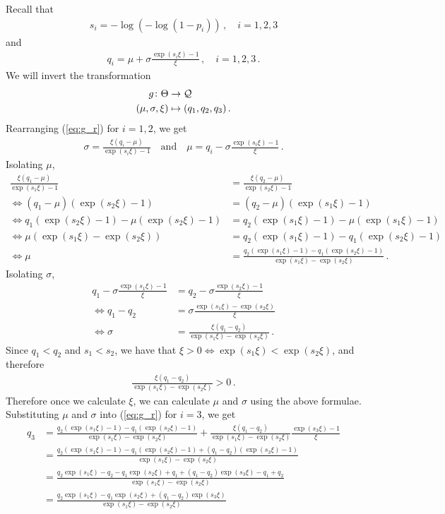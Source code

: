 %
Recall that
%
\begin{align*}
s_i = -\log(-\log(1 - p_i)) \,, \quad i = 1, 2, 3 
\end{align*}
%
and
%
\begin{align}
q_i = \mu + \sigma \frac{\exp(s_i \xi) - 1}{\xi} \,, \quad i = 1, 2, 3 \,.
\label{eq:g_r}
\end{align}
%
We will invert the transformation
%
\begin{align*}
g \colon \Theta &\to {\cal Q}\\
(\mu, \sigma, \xi) &\mapsto (q_{1}, q_{2}, q_{3}) \,.
\end{align*}
%
Rearranging (\ref{eq:g_r}) for $i = 1, 2$, we get
%
\begin{align*}
\sigma = \frac{\xi(q_i - \mu)}{\exp(s_i \xi) - 1} \quad
\text{and} \quad \mu = q_i - \sigma \frac{\exp(s_i \xi) - 1}{\xi} \,.
\end{align*}
%
Isolating $\mu$,
%
\begin{align*}
\frac{\xi(q_1 - \mu)}{\exp(s_1 \xi) - 1}
&= \frac{\xi(q_2 - \mu)}{\exp(s_2 \xi) - 1}\\
\iff (q_1 - \mu)(\exp(s_2 \xi) - 1) &= (q_2 - \mu)(\exp(s_1 \xi) - 1)\\
\iff q_1 (\exp(s_2 \xi) - 1) - \mu(\exp(s_2 \xi) - 1)
&= q_2 (\exp(s_1 \xi) - 1) - \mu (\exp(s_1 \xi) - 1)\\
\iff \mu(\exp(s_1 \xi) - \exp(s_2 \xi))
&= q_2 (\exp(s_1 \xi) - 1) - q_1 (\exp(s_2 \xi) - 1)\\
\iff \mu &= \frac{q_2 (\exp(s_1 \xi) - 1) - q_1 (\exp(s_2 \xi) - 1)}
{\exp(s_1 \xi) - \exp(s_2 \xi)} \,.
\end{align*}
%
Isolating $\sigma$,
%
\begin{align*}
q_1 - \sigma \frac{\exp(s_1 \xi) - 1}{\xi}
&= q_2 - \sigma \frac{\exp(s_2 \xi) - 1}{\xi}\\
\iff q_1 - q_2 &= \sigma \frac{\exp(s_1 \xi) - \exp(s_2 \xi)}{\xi}\\
\iff \sigma &= \frac{\xi (q_1 - q_2)}{\exp(s_1 \xi) - \exp(s_2 \xi)} \,.
\end{align*}
%
Since $q_1 < q_2$ and $s_1 < s_2$,
we have that $\xi > 0 \iff \exp(s_1 \xi)<\exp(s_2 \xi)$, and therefore
%
\begin{align*}
\frac{\xi(q_1 - q_2)}{\exp(s_1 \xi) - \exp(s_2 \xi)} > 0 \,.
\end{align*}
%
Therefore once we calculate $\xi$, we can calculate $\mu$ and $\sigma$
using the above formulae.
Substituting $\mu$ and $\sigma$ into (\ref{eq:g_r}) for $i = 3$, we get
%
\begin{align*}
q_3 &= \frac{q_2 (\exp(s_1 \xi) - 1) - q_1 (\exp(s_2 \xi) - 1)}
{\exp(s_1 \xi) - \exp(s_2 \xi)} + \frac{\xi (q_1 - q_2)}
{\exp(s_1 \xi) - \exp(s_2 \xi)} \frac{\exp(s_3 \xi) - 1}{\xi}\\
&= \frac{q_2 (\exp(s_1 \xi) - 1) - q_1 (\exp(s_2 \xi) - 1)
	+ (q_1 - q_2)(\exp(s_3 \xi) - 1)}{\exp(s_1 \xi) - \exp(s_2 \xi)}\\
&= \frac{q_2 \exp(s_1 \xi) - q_2 - q_1 \exp(s_2 \xi) + q_1 + (q_1 - q_2)
	\exp(s_3 \xi) - q_1 + q_2}{\exp(s_1 \xi) - \exp(s_2 \xi)}\\
&= \frac{q_2 \exp(s_1 \xi) - q_1 \exp(s_2 \xi) + (q_1 - q_2) \exp(s_3 \xi)}
{\exp(s_1 \xi) - \exp(s_2 \xi)}
\end{align*}
